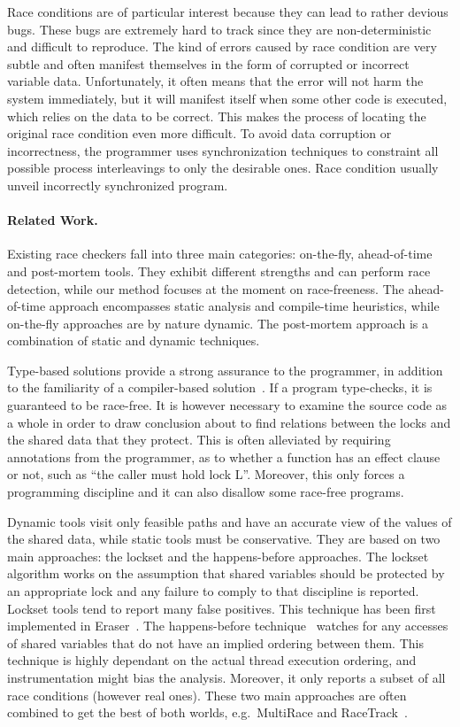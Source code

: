 Race conditions are of particular interest because they can lead to
rather devious bugs. These bugs are extremely hard to track since they
are non-deterministic and difficult to reproduce. The kind of errors
caused by race condition are very subtle and often manifest themselves
in the form of corrupted or incorrect variable data. Unfortunately, it
often means that the error will not harm the system immediately, but
it will manifest itself when some other code is executed, which relies
on the data to be correct. This makes the process of locating the
original race condition even more difficult.
%
To avoid data corruption or incorrectness, the programmer uses
synchronization techniques to constraint all possible process
interleavings to only the desirable ones. Race condition usually
unveil incorrectly synchronized program.

\paragraph{\bf Related Work.}
Existing race checkers fall into three main categories: on-the-fly,
ahead-of-time and post-mortem tools. They exhibit different strengths
and can perform race detection, while our method focuses at the moment
on race-freeness. The ahead-of-time approach encompasses static
analysis and compile-time heuristics, while on-the-fly approaches are
by nature dynamic. The post-mortem approach is a combination of static
and dynamic techniques.

Type-based solutions provide a strong assurance to the programmer, in
addition to the familiarity of a compiler-based
solution~\cite{FQ03}. If a program type-checks, it is guaranteed to be
race-free. It is however necessary to examine the source code as a
whole in order to draw conclusion about to find relations between the
locks and the shared data that they protect. This is often alleviated
by requiring annotations from the programmer, as to whether a function
has an effect clause or not, such as ``the caller must hold lock
L''. Moreover, this only forces a programming discipline and it can
also disallow some race-free programs.

Dynamic tools visit only feasible paths and have an accurate view of
the values of the shared data, while static tools must be
conservative. They are based on two main approaches: the lockset and
the happens-before approaches. The lockset algorithm works on the
assumption that shared variables should be protected by an appropriate
lock and any failure to comply to that discipline is reported. Lockset
tools tend to report many false positives. This technique has been
first implemented in Eraser~\cite{SBNSA07:Eraser}. The happens-before
technique~\cite{Lamport:ordering} watches for any accesses of shared
variables that do not have an implied ordering between them. This
technique is highly dependant on the actual thread execution ordering,
and instrumentation might bias the analysis. Moreover, it only reports
a subset of all race conditions (however real ones). These two main
approaches are often combined to get the best of both worlds, e.g.\
MultiRace and RaceTrack~\cite{YRC05:RaceTrack,PS03:MultiRace}.


